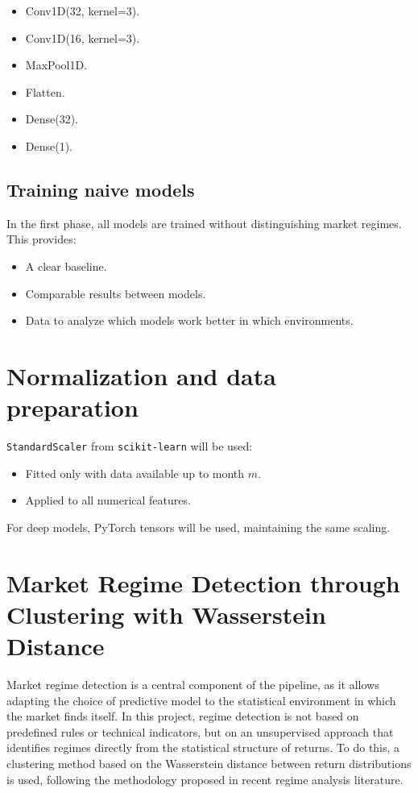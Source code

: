 \documentclass[12pt]{article}
\begin{document}
\begin{itemize}
    \item Conv1D(32, kernel=3).
    \item Conv1D(16, kernel=3).
    \item MaxPool1D.
    \item Flatten.
    \item Dense(32).
    \item Dense(1).
\end{itemize}

\subsection{Training naive models}

In the first phase, all models are trained without distinguishing market regimes. This provides:

\begin{itemize}
    \item A clear baseline.
    \item Comparable results between models.
    \item Data to analyze which models work better in which environments.
\end{itemize}

\section{Normalization and data preparation}

\texttt{StandardScaler} from \texttt{scikit-learn} will be used:

\begin{itemize}
    \item Fitted only with data available up to month $m$.
    \item Applied to all numerical features.
\end{itemize}

For deep models, PyTorch tensors will be used, maintaining the same scaling.

\section{Market Regime Detection through Clustering with Wasserstein Distance}

Market regime detection is a central component of the pipeline, as it allows adapting the choice of predictive model to the statistical environment in which the market finds itself. In this project, regime detection is not based on predefined rules or technical indicators, but on an unsupervised approach that identifies regimes directly from the statistical structure of returns. To do this, a clustering method based on the Wasserstein distance between return distributions is used, following the methodology proposed in recent regime analysis literature.
\end{document}
